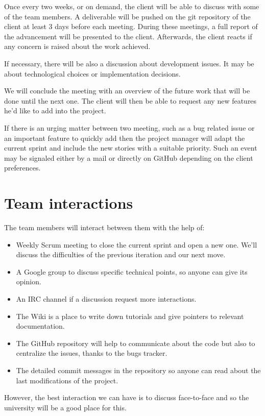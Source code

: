 \documentclass[12pt,a4paper]{article}
\begin{document}
Once every two weeks, or on demand, the client will be able to discuss with some of the team members. A deliverable will be pushed on the git repository of the client at least 3 days before each meeting. During these meetings, a full report of the advancement will be presented to the client. Afterwards, the client reacts if any concern is raised about the work achieved.

If necessary, there will be also a discussion about development
issues. It may be about technological choices or implementation
decisions.

We will conclude the meeting with an overview of the future work that
will be done until the next one. The client will then be able to
request any new features he'd like to add into the project.

If there is an urging matter between two meeting, such as a bug
related issue or an important feature to quickly add then the project
manager will adapt the current sprint and include the new stories with
a suitable priority. Such an event may be signaled either by a mail
or directly on GitHub depending on the client preferences.

\section{Team interactions}

The team members will interact between them with the help of:

\begin{itemize}
\item Weekly Scrum meeting to close the current sprint and open a new one. We'll discuss the difficulties of the previous iteration and our next move.
\item A Google group to discuss specific technical points, so anyone can give its opinion.
\item An IRC channel if a discussion request more interactions.
\item The Wiki is a place to write down tutorials and give pointers to relevant documentation.
\item The GitHub repository will help to communicate about the code but also to centralize the issues, thanks to the bugs tracker.
\item The detailed commit messages in the repository so anyone can read about the last modifications of the project.
\end{itemize}

However, the best interaction we can have is to discuss face-to-face and so the university will be a good place for this.
\end{document}
